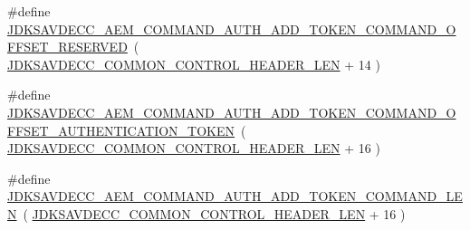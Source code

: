 \begin{DoxyCompactItemize}
\#define \hyperlink{group__command__auth__add__token_ga6ec4b9e5a7d06aba6519b56dc0d85383}{J\+D\+K\+S\+A\+V\+D\+E\+C\+C\+\_\+\+A\+E\+M\+\_\+\+C\+O\+M\+M\+A\+N\+D\+\_\+\+A\+U\+T\+H\+\_\+\+A\+D\+D\+\_\+\+T\+O\+K\+E\+N\+\_\+\+C\+O\+M\+M\+A\+N\+D\+\_\+\+O\+F\+F\+S\+E\+T\+\_\+\+R\+E\+S\+E\+R\+V\+ED}~( \hyperlink{group__jdksavdecc__avtp__common__control__header_gaae84052886fb1bb42f3bc5f85b741dff}{J\+D\+K\+S\+A\+V\+D\+E\+C\+C\+\_\+\+C\+O\+M\+M\+O\+N\+\_\+\+C\+O\+N\+T\+R\+O\+L\+\_\+\+H\+E\+A\+D\+E\+R\+\_\+\+L\+EN} + 14 )
\item 
\#define \hyperlink{group__command__auth__add__token_gaa4d5ad221067b0d33f3678bfae39120d}{J\+D\+K\+S\+A\+V\+D\+E\+C\+C\+\_\+\+A\+E\+M\+\_\+\+C\+O\+M\+M\+A\+N\+D\+\_\+\+A\+U\+T\+H\+\_\+\+A\+D\+D\+\_\+\+T\+O\+K\+E\+N\+\_\+\+C\+O\+M\+M\+A\+N\+D\+\_\+\+O\+F\+F\+S\+E\+T\+\_\+\+A\+U\+T\+H\+E\+N\+T\+I\+C\+A\+T\+I\+O\+N\+\_\+\+T\+O\+K\+EN}~( \hyperlink{group__jdksavdecc__avtp__common__control__header_gaae84052886fb1bb42f3bc5f85b741dff}{J\+D\+K\+S\+A\+V\+D\+E\+C\+C\+\_\+\+C\+O\+M\+M\+O\+N\+\_\+\+C\+O\+N\+T\+R\+O\+L\+\_\+\+H\+E\+A\+D\+E\+R\+\_\+\+L\+EN} + 16 )
\item 
\#define \hyperlink{group__command__auth__add__token_gad1298ed4a1b7f5d8f13b7a16a0ddbd83}{J\+D\+K\+S\+A\+V\+D\+E\+C\+C\+\_\+\+A\+E\+M\+\_\+\+C\+O\+M\+M\+A\+N\+D\+\_\+\+A\+U\+T\+H\+\_\+\+A\+D\+D\+\_\+\+T\+O\+K\+E\+N\+\_\+\+C\+O\+M\+M\+A\+N\+D\+\_\+\+L\+EN}~( \hyperlink{group__jdksavdecc__avtp__common__control__header_gaae84052886fb1bb42f3bc5f85b741dff}{J\+D\+K\+S\+A\+V\+D\+E\+C\+C\+\_\+\+C\+O\+M\+M\+O\+N\+\_\+\+C\+O\+N\+T\+R\+O\+L\+\_\+\+H\+E\+A\+D\+E\+R\+\_\+\+L\+EN} + 16 )
\end{DoxyCompactItemize}

